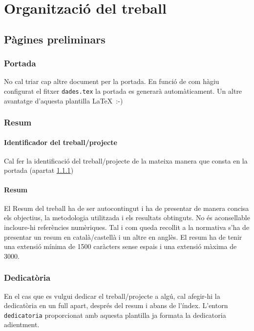 \chapter{Organització del treball}

\section{Pàgines preliminars}

\subsection{Portada}\label{S:portada}

No cal triar cap altre document per la portada. En funció de com hàgiu configurat el fitxer \texttt{dades.tex} la portada es generarà automàticament. Un altre avantatge d'aquesta plantilla \LaTeX \ :-)

\subsection{Resum}

\subsubsection{Identificador del treball/projecte}

Cal fer la identificació del treball/projecte de la mateixa manera que consta en la portada (apartat \ref{S:portada})

\subsubsection{Resum}

El Resum del treball ha de ser autocontingut i ha de presentar de manera concisa els objectius, la metodologia utilitzada i els resultats obtinguts. No és aconsellable incloure-hi referències numèriques. Tal i com queda recollit a la normativa s'ha de presentar un resum en català/castellà i un altre en anglès. El resum ha de tenir una extensió mínima de 1500 caràcters sense espais i una extensió màxima de 3000.


\subsection{Dedicatòria}

En el cas que es vulgui dedicar el treball/projecte a algú, cal afegir-hi la dedicatòria en un full apart, després del resum i abans de l'índex. L'entorn \texttt{dedicatoria} proporcionat amb aquesta plantilla ja formata la dedicatoria adientment. 


